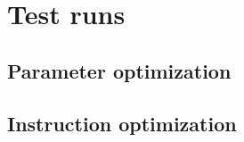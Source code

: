 \documentclass{article}
\begin{document}
    \section{Test runs}
    \subsection{Parameter optimization}\label{appendix:parameterdata}
        

    \subsection{Instruction optimization}\label{appendix:assemblydata}
        

 

\end{document}
